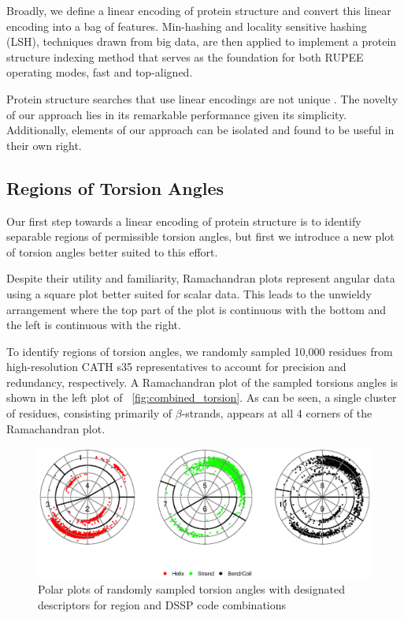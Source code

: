\documentclass[letter,center,fleqn]{NAR}
\begin{document}
Broadly, we define a linear encoding of protein structure and convert this linear encoding into a bag of features. 
Min-hashing and locality sensitive hashing (LSH), techniques drawn from big data, are then applied to implement a protein structure indexing method that serves as the foundation for both RUPEE operating modes, fast and top-aligned. 

Protein structure searches that use linear encodings are not unique \cite{Carpentier2005,Daniluk2011,Ritchie2012}.
The novelty of our approach lies in its remarkable performance given its simplicity. 
Additionally, elements of our approach can be isolated and found to be useful in their own right. 

\subsection{Regions of Torsion Angles}

Our first step towards a linear encoding of protein structure is to identify separable regions of permissible torsion angles,
but first we introduce a new plot of torsion angles better suited to this effort. 

Despite their utility and familiarity, Ramachandran plots \cite{Ramachandran1968} represent angular data using a square plot better suited for scalar data.
This leads to the unwieldy arrangement where the top part of the plot is continuous with the bottom and the left is continuous with the right. 

To identify regions of torsion angles, we randomly sampled 10,000 residues from high-resolution CATH s35 representatives to account for precision and redundancy, respectively. 
A Ramachandran plot of the sampled torsions angles is shown in the left plot of \figurename~\ref{fig:combined_torsion}. 
As can be seen, a single cluster of residues, consisting primarily of $\beta$-strands, appears at all 4 corners of the Ramachandran plot.

\begin{figure}[tb]
\begin{center}
\includegraphics{regions}
\end{center}
\caption{Polar plots of randomly sampled torsion angles with designated descriptors for region and DSSP code combinations}
\label{fig:regions}
\end{figure}
\end{document}
